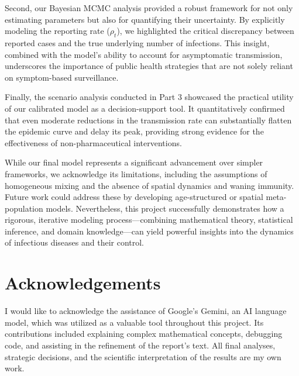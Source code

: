 \documentclass[12pt, a4paper]{article}
\begin{document}
Second, our Bayesian MCMC analysis provided a robust framework for not only estimating parameters but also for quantifying their uncertainty. By explicitly modeling the reporting rate ($\rho_t$), we highlighted the critical discrepancy between reported cases and the true underlying number of infections. This insight, combined with the model's ability to account for asymptomatic transmission, underscores the importance of public health strategies that are not solely reliant on symptom-based surveillance.

Finally, the scenario analysis conducted in Part 3 showcased the practical utility of our calibrated model as a decision-support tool. It quantitatively confirmed that even moderate reductions in the transmission rate can substantially flatten the epidemic curve and delay its peak, providing strong evidence for the effectiveness of non-pharmaceutical interventions.

While our final model represents a significant advancement over simpler frameworks, we acknowledge its limitations, including the assumptions of homogeneous mixing and the absence of spatial dynamics and waning immunity. Future work could address these by developing age-structured or spatial meta-population models. Nevertheless, this project successfully demonstrates how a rigorous, iterative modeling process—combining mathematical theory, statistical inference, and domain knowledge—can yield powerful insights into the dynamics of infectious diseases and their control.

\newpage
\section*{Acknowledgements}
I would like to acknowledge the assistance of Google's Gemini, an AI language model, which was utilized as a valuable tool throughout this project. Its contributions included explaining complex mathematical concepts, debugging code, and assisting in the refinement of the report's text. All final analyses, strategic decisions, and the scientific interpretation of the results are my own work.
\end{document}
